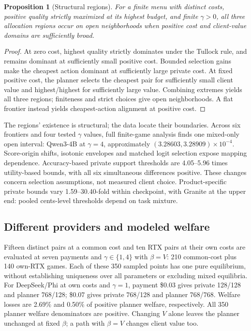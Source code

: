 \documentclass[sigconf,anonymous,nonacm]{acmart}
\newtheorem{proposition}{Proposition}
\begin{document}
\begin{proposition}[Structural regions]\label{prop:regions}
For a finite menu with distinct costs, positive quality strictly maximized at its highest budget, and finite $\gamma>0$, all three allocation regions occur on open neighborhoods when positive cost and client-value domains are sufficiently broad.
\end{proposition}
\begin{proof}
At zero cost, highest quality strictly dominates under the Tullock rule, and remains dominant at sufficiently small positive cost. Bounded selection gains make the cheapest action dominant at sufficiently large private cost. At fixed positive cost, the planner selects the cheapest pair for sufficiently small client value and highest/highest for sufficiently large value. Combining extremes yields all three regions; finiteness and strict choices give open neighborhoods. A flat frontier instead yields cheapest-action alignment at positive cost.
\end{proof}
The regions' existence is structural; the data locate their boundaries. Across six frontiers and four tested $\gamma$ values, full finite-game analysis finds one mixed-only open interval: Qwen3-4B at $\gamma=4$, approximately $(3.28603,3.28909)\times10^{-4}$. Score-origin shifts, isotonic envelopes and matched logit selection expose mapping dependence. Accuracy-based private support thresholds are 4.05--5.96 times utility-based bounds, with all six simultaneous differences positive. These changes concern selection assumptions, not measured client choice. Product-specific private bounds vary 1.59--30.40-fold within checkpoint, with Granite at the upper end: pooled cents-level thresholds depend on task mixture.

\subsection{Different providers and modeled welfare}
Fifteen distinct pairs at a common cost and ten RTX pairs at their own costs are evaluated at seven payments and $\gamma\in\{1,4\}$ with $\beta=V$: 210 common-cost plus 140 own-RTX games. Each of these 350 sampled points has one pure equilibrium, without establishing uniqueness over all parameters or excluding mixed equilibria. For DeepSeek/Phi at own costs and $\gamma=1$, payment \$0.03 gives private 128/128 and planner 768/128; \$0.07 gives private 768/128 and planner 768/768. Welfare losses are 2.69\% and 0.50\% of positive planner welfare, respectively. All 350 planner welfare denominators are positive. Changing $V$ alone leaves the planner unchanged at fixed $\beta$; a path with $\beta=V$ changes client value too.
\end{document}
